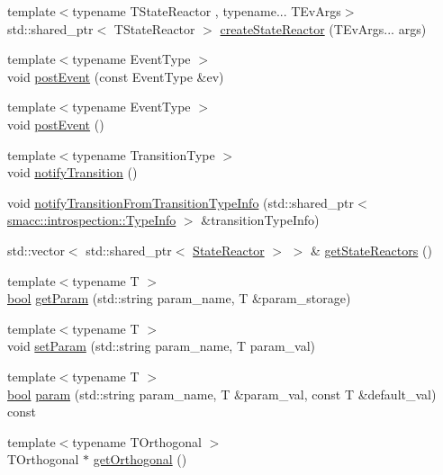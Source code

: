 \begin{DoxyCompactItemize}
\item 
{\footnotesize template$<$typename T\+State\+Reactor , typename... T\+Ev\+Args$>$ }\\std\+::shared\+\_\+ptr$<$ T\+State\+Reactor $>$ \hyperlink{classsmacc_1_1ISmaccState_a92bba7b456f026467f23c3cd6ceb5985}{create\+State\+Reactor} (T\+Ev\+Args... args)
\item 
{\footnotesize template$<$typename Event\+Type $>$ }\\void \hyperlink{classsmacc_1_1ISmaccState_acef404ab3766ddf2892e8dad14a4a7cf}{post\+Event} (const Event\+Type \&ev)
\item 
{\footnotesize template$<$typename Event\+Type $>$ }\\void \hyperlink{classsmacc_1_1ISmaccState_a1308e7a5348de1870c26b3b00a92cf55}{post\+Event} ()
\item 
{\footnotesize template$<$typename Transition\+Type $>$ }\\void \hyperlink{classsmacc_1_1ISmaccState_a98df316afd79180d3c27a15a7d5dd1cf}{notify\+Transition} ()
\item 
void \hyperlink{classsmacc_1_1ISmaccState_acb3dd7d402c634004ae3b67a01169438}{notify\+Transition\+From\+Transition\+Type\+Info} (std\+::shared\+\_\+ptr$<$ \hyperlink{classsmacc_1_1introspection_1_1TypeInfo}{smacc\+::introspection\+::\+Type\+Info} $>$ \&transition\+Type\+Info)
\item 
std\+::vector$<$ std\+::shared\+\_\+ptr$<$ \hyperlink{classsmacc_1_1StateReactor}{State\+Reactor} $>$ $>$ \& \hyperlink{classsmacc_1_1ISmaccState_acc40f4b3dd02a39242c7e23fe13c3e16}{get\+State\+Reactors} ()
\item 
{\footnotesize template$<$typename T $>$ }\\\hyperlink{classbool}{bool} \hyperlink{classsmacc_1_1ISmaccState_abbb3a24b912c6e8de28f7b86123b6357}{get\+Param} (std\+::string param\+\_\+name, T \&param\+\_\+storage)
\item 
{\footnotesize template$<$typename T $>$ }\\void \hyperlink{classsmacc_1_1ISmaccState_a0b6c531ca8c446052022308548f55b92}{set\+Param} (std\+::string param\+\_\+name, T param\+\_\+val)
\item 
{\footnotesize template$<$typename T $>$ }\\\hyperlink{classbool}{bool} \hyperlink{classsmacc_1_1ISmaccState_a4f2ff8e3eda8aa9bbb60c8ff17d0def1}{param} (std\+::string param\+\_\+name, T \&param\+\_\+val, const T \&default\+\_\+val) const
\item 
{\footnotesize template$<$typename T\+Orthogonal $>$ }\\T\+Orthogonal $\ast$ \hyperlink{classsmacc_1_1ISmaccState_afc5c5683cbe39964a52fc3a2553196d2}{get\+Orthogonal} ()
\end{DoxyCompactItemize}
